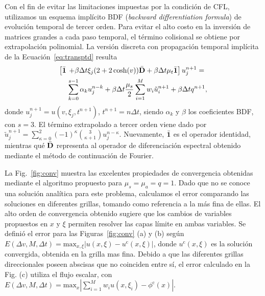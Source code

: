 Con el fin de evitar las
limitaciones impuestas por la condición de CFL, utilizamos un 
esquema implícito BDF ({\em backward differentiation formula}) de evolución temporal de tercer orden. 
Para evitar el alto costo en la inversión de matrices grandes a 
cada paso temporal, el término 
colisional se obtiene por extrapolación polinomial. La versión discreta con propagación temporal 
implícita de la Ecuación~\eqref{eq:transptd} resulta
\begin{equation*}
\begin{aligned}
 \left[ \bar{\mathbf{1}} \right. & \left.+ \beta\Delta t\xi_j (2+2\cosh(v)) \bar{\mathbf{D}} + \beta\Delta t \mu_t \bar{\mathbf{1}} \right]  
 u^{n+1}_j  = \\
&\sum_{k=0}^{s-1}\alpha_k u_j^{n-k} + \beta\Delta t \frac{\mu_s}{2}
 \sum_{i=1}^{M} w_i \tilde{u}_i^{n+1} + \beta\Delta t q^{n+1},
\end{aligned}
\label{eq:transptd1disc}
\end{equation*}
donde $u^{n+1}_j=u(v,\xi_j,t^{n+1})$, $t^{n+1}=n\Delta t$, siendo $\alpha_k$ y $\beta$ 
los coeficientes BDF, con $s=3$. El término extrapolado 
a tercer orden viene dado por $\tilde{u}_j^{n+1}=\sum_{\kappa=0}^{2}(-1)^\kappa {3 \choose \kappa+1} u_j^{n-\kappa}$. Nuevamente, 
$\bar{\mathbf{1}}$ es el operador identidad, mientras qué $\bar{\mathbf{D}}$ representa al operador 
de diferenciación espectral obtenido mediante el método de continuación de Fourier. 

La Fig.~\eqref{fig:conv} muestra las excelentes propiedades de convergencia 
obtenidas mediante el algoritmo propuesto para $\mu_s=\mu_a=q=1$. Dado 
que no se conoce una solución analítica para este problema, calculamos 
el error comparando las soluciones en diferentes grillas, tomando 
como referencia a la más fina de ellas. El alto orden 
de convergencia obtenido sugiere que los cambios de variables 
propuestos en $x$ y $\xi$ permiten 
resolver las capas límite en ambas variables. 
Se definió el error para las Figuras~\eqref{fig:conv} (a) y (b) según
  $E(\Delta v, M,\Delta t)=\text{max}_{x,\xi}
    |u(x,\xi)-u^{\text{c}}(x,\xi)|$, donde $u^{\text{c}}(x,\xi)$ 
    es la solución convergida, obtenida en la grilla mas fina. 
Debido a que las diferentes 
    grillas direccionales poseen abscisas que no coinciden 
    entre sí,  
    el error calculado en la Fig. (c) utiliza el flujo escalar, con  
$E(\Delta v, M,\Delta t)=\text{max}_x |\sum_{i=1}^M w_i u(x,\xi_i)-\phi^{\text{c}}(x)|$.

